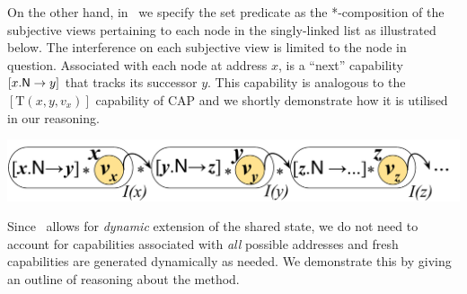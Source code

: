 On the other hand, in \colosl\ we specify the set predicate as the *-composition of the subjective views pertaining to each node in the singly-linked list as illustrated below. The interference on each subjective view is limited to the node in question. Associated with each node at address $x$, is a ``next'' capability $\nextC{x}{y}$ that tracks its successor $y$. This capability is analogous to the $[\text{T}(x, y, v_{x})]$ capability of CAP and we shortly demonstrate how it is utilised in our reasoning.  
%
\begin{center}
\includegraphics[scale=0.24]{Sections/FurtherExamples/Images/coloslSet.pdf}
\end{center}
%
Since \colosl\ allows for \emph{dynamic} extension of the shared state, we do not need to account for capabilities associated with \emph{all} possible addresses and fresh capabilities are generated dynamically as needed. We demonstrate this by giving an outline of reasoning about the  method. 

